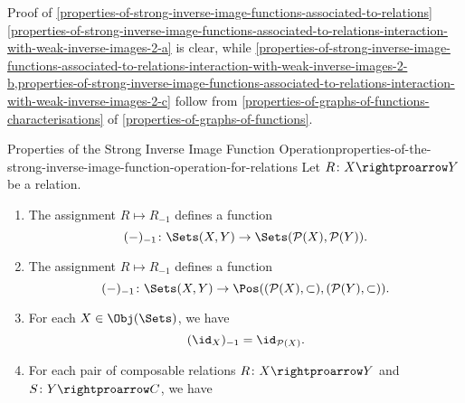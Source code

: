 \begin{Proof}{Proof of \cref{properties-of-strong-inverse-image-functions-associated-to-relations}}
    \cref{properties-of-strong-inverse-image-functions-associated-to-relations-interaction-with-weak-inverse-images-2-a} is clear, while \cref{properties-of-strong-inverse-image-functions-associated-to-relations-interaction-with-weak-inverse-images-2-b,properties-of-strong-inverse-image-functions-associated-to-relations-interaction-with-weak-inverse-images-2-c} follow from \cref{properties-of-graphs-of-functions-characterisations} of \cref{properties-of-graphs-of-functions}.
\end{Proof}
\begin{proposition}{Properties of the Strong Inverse Image Function Operation}{properties-of-the-strong-inverse-image-function-operation-for-relations}%
    Let $R\colon X\rightproarrow Y$ be a relation.
    \begin{enumerate}
        \item\label{properties-of-the-strong-inverse-image-function-operation-for-relations-functionality-1}The assignment $R\mapsto R_{-1}$ defines a function
            \[
                (-)_{-1}%
                \colon%
                \Sets(X,Y)
                \to%
                \Sets(\mathcal{P}(X),\mathcal{P}(Y)).
            \]%
        \item\label{properties-of-the-strong-inverse-image-function-operation-for-relations-functionality-2}The assignment $R\mapsto R_{-1}$ defines a function
            \[
                (-)_{-1}%
                \colon%
                \Sets(X,Y)
                \to%
                \Pos((\mathcal{P}(X),\subset),(\mathcal{P}(Y),\subset)).
            \]%
        \item\label{properties-of-the-strong-inverse-image-function-operation-for-relations-interaction-with-identities}For each $X\in\Obj(\Sets)$, we have
            \[
                (\id_{X})_{-1}%
                =%
                \id_{\mathcal{P}(X)}.%
            \]%
        \item\label{properties-of-the-strong-inverse-image-function-operation-for-relations-interaction-with-composition}For each pair of composable relations $R\colon X\rightproarrow Y$ and $S\colon Y\rightproarrow C$, we have%
            \begin{webcompile}

\end{webcompile}
\end{enumerate}
\end{proposition}
